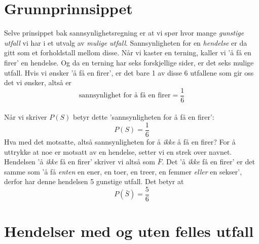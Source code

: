 

%

\section{Grunnprinnsippet}
Selve prinsippet bak sannsynlighetsregning er at vi spør hvor mange \textit{gunstige utfall}  vi har i et utvalg av \textit{mulige utfall}. Sannsynligheten for en \textit{hendelse} er da gitt som et forholdstall mellom disse. \regv
{} \vsk
Når vi kaster en terning, kaller vi 'å få en firer' en hendelse. Og da en terning har seks forskjellige sider, er det seks mulige utfall.
Hvis vi ønsker 'å få en firer', er det bare 1 av disse 6 utfallene som gir oss det vi ønsker, altså er
\[ \text{sannsynlighet for å få en firer}=
 \frac{1}{6} \]
\qquad {} \\[5pt]
Når vi skriver $P(S)$ betyr dette 'sannsynligheten for å få en firer':
\[ P(S)=\frac{1}{6} \]
Hva med det motsatte, altså sannsynligheten for å \textsl{ikke} å få en firer? For å uttrykke at noe er motsatt av en hendelse, setter vi en strek over navnet. Hendelsen 'å \textsl{ikke} få en firer' skriver vi altså som $ \bar{F} $. Det 'å \textsl{ikke} få en firer' er det samme som 'å få \textsl{enten} en ener, en toer, en treer, en femmer \textsl{eller} en sekser', derfor har denne hendelsen 5 gunstige utfall. Det betyr at
\[ P(\bar{S})=\frac{5}{6} \]
 \vsk

\section{Hendelser med og uten felles utfall}
